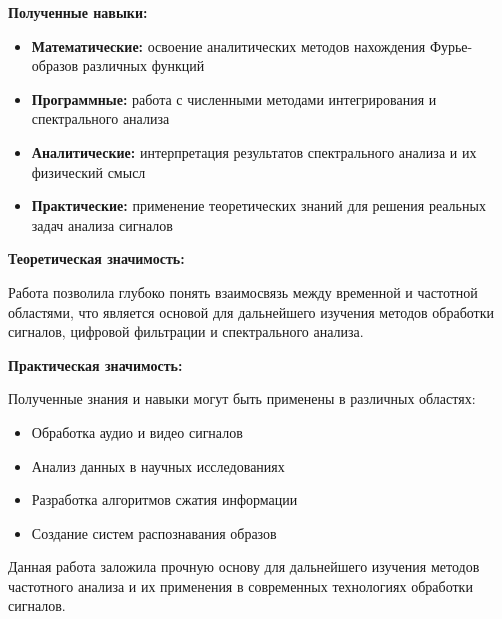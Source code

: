\textbf{Полученные навыки:}

\begin{itemize}
    \item \textbf{Математические:} освоение аналитических методов нахождения Фурье-образов различных функций
    \item \textbf{Программные:} работа с численными методами интегрирования и спектрального анализа
    \item \textbf{Аналитические:} интерпретация результатов спектрального анализа и их физический смысл
    \item \textbf{Практические:} применение теоретических знаний для решения реальных задач анализа сигналов
\end{itemize}

\textbf{Теоретическая значимость:}

Работа позволила глубоко понять взаимосвязь между временной и частотной областями, что является основой для дальнейшего изучения методов обработки сигналов, цифровой фильтрации и спектрального анализа.

\textbf{Практическая значимость:}

Полученные знания и навыки могут быть применены в различных областях:
\begin{itemize}
    \item Обработка аудио и видео сигналов
    \item Анализ данных в научных исследованиях
    \item Разработка алгоритмов сжатия информации
    \item Создание систем распознавания образов
\end{itemize}

Данная работа заложила прочную основу для дальнейшего изучения методов частотного анализа и их применения в современных технологиях обработки сигналов.

